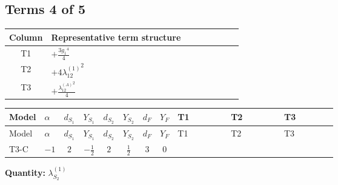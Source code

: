 \documentclass[8pt]{article}
\begin{document}
\begin{landscape}
\subsection*{Terms 4 of 5}
\begin{center}
\begin{tabular}{@{}c >{\raggedright\arraybackslash}p{0.82\linewidth}@{}}
\toprule
Column & Representative term structure \\
\midrule
T1 & \(\displaystyle +\frac{3 {g_1}^4}{4}\) \\
\midrule
T2 & \(\displaystyle +4 {\lambda_{12}^{(1)}}^2\) \\
\midrule
T3 & \(\displaystyle +\frac{{\lambda_{12}^{(A)}}^2}{4}\) \\
\midrule
\bottomrule
\end{tabular}
\end{center}
\smallskip
\tiny
\begin{longtable}{@{}llcccccc >{\raggedright\arraybackslash}p{0.21\linewidth} >{\raggedright\arraybackslash}p{0.21\linewidth} >{\raggedright\arraybackslash}p{0.21\linewidth}@{}}
\toprule
Model & $\alpha$ & $d_{S_1}$ & $Y_{S_1}$ & $d_{S_2}$ & $Y_{S_2}$ & $d_F$ & $Y_F$ & T1 & T2 & T3 \\
\midrule
\endfirsthead
\toprule
Model & $\alpha$ & $d_{S_1}$ & $Y_{S_1}$ & $d_{S_2}$ & $Y_{S_2}$ & $d_F$ & $Y_F$ & T1 & T2 & T3 \\
\midrule
\endhead
T3-C & $-1$ & $2$ & $-\frac{1}{2}$ & $2$ & $\frac{1}{2}$ & $3$ & $0$ & \scriptsize\adjustbox{max width=\linewidth}{$\begin{gathered} +\frac{3 {g_1}^4}{4}\end{gathered}$} & \scriptsize\adjustbox{max width=\linewidth}{$\begin{gathered} +4 {\lambda_{12}^{(1)}}^2\end{gathered}$} & \scriptsize\adjustbox{max width=\linewidth}{$\begin{gathered} +\frac{{\lambda_{12}^{(A)}}^2}{4}\end{gathered}$} \\
\midrule
\bottomrule
\end{longtable}
\clearpage
\noindent\textbf{Quantity: }$\lambda_{S_2}^{(1)}$\par\smallskip

\end{landscape}
\end{document}
